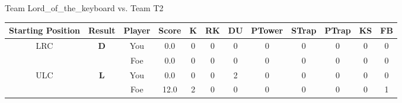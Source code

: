 \documentclass[a4paper,12pt]{article}
\begin{document}
  \vspace*{2em}
  \par {\large {\color{Gray} Team} Lord\_of\_the\_keyboard {\color{Gray}
      vs. Team} T2}
  \newline
  \begin{tabular}[t]{| c | c | c | c | c | c | c | c | c | c | c | c
      |}
    \hline
    Starting Position & \textbf{Result} & Player & \textbf{Score} & K & RK & DU & PTower & STrap & PTrap & KS & FB \\
    
      
                      
      
                      
      
                      
      
                      
      
        \hline
        \multirow{2}{*}{  LRC
             } &
              \multirow{2}{*}{  
                  \textbf{D}  } & 
                    \cellcolor{yellow!25} You & \cellcolor{yellow!25} 0.0 & \cellcolor{yellow!25} 0 &
                    \cellcolor{yellow!25} 0 & \cellcolor{yellow!25} 0 & \cellcolor{yellow!25} 0 &
                    \cellcolor{yellow!25} 0 & \cellcolor{yellow!25} 0 & \cellcolor{yellow!25} 0 &
                    \cellcolor{yellow!25} 0 \\
                    \cline{3-12}
                    & & \cellcolor{red!15} Foe & \cellcolor{red!15} 0.0 & \cellcolor{red!15} 0 & \cellcolor{red!15}
                    0 & \cellcolor{red!15} 0
                    & \cellcolor{red!15} 0 & \cellcolor{red!15}
                    0 & \cellcolor{red!15} 0 
                    & \cellcolor{red!15} 0 & \cellcolor{red!15}
                    0 \\
                    
                      
      
                      
      
                      
      
                      
      
                      
      
                      
      
                      
      
        \hline
        \multirow{2}{*}{  ULC  } &
              \multirow{2}{*}{  \textbf{L}  } & 
                    \cellcolor{yellow!25} You & \cellcolor{yellow!25} 0.0 & \cellcolor{yellow!25} 0 &
                    \cellcolor{yellow!25} 0 & \cellcolor{yellow!25} 2 & \cellcolor{yellow!25} 0 &
                    \cellcolor{yellow!25} 0 & \cellcolor{yellow!25} 0 & \cellcolor{yellow!25} 0 &
                    \cellcolor{yellow!25} 0 \\
                    \cline{3-12}
                    & & \cellcolor{red!15} Foe & \cellcolor{red!15} 12.0 & \cellcolor{red!15} 2 & \cellcolor{red!15}
                    0 & \cellcolor{red!15} 0
                    & \cellcolor{red!15} 0 & \cellcolor{red!15}
                    0 & \cellcolor{red!15} 0 
                    & \cellcolor{red!15} 0 & \cellcolor{red!15}
                    1 \\
                    

\end{tabular}
\end{document}
